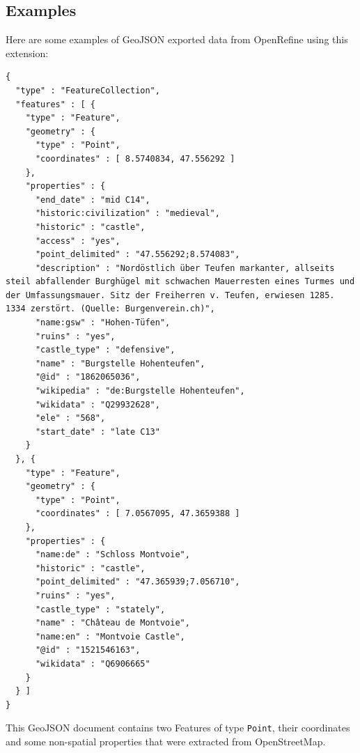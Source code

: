 \subsection{Examples}
Here are some examples of GeoJSON exported data from OpenRefine using this extension:
\begin{verbatim}
{
  "type" : "FeatureCollection",
  "features" : [ {
    "type" : "Feature",
    "geometry" : {
      "type" : "Point",
      "coordinates" : [ 8.5740834, 47.556292 ]
    },
    "properties" : {
      "end_date" : "mid C14",
      "historic:civilization" : "medieval",
      "historic" : "castle",
      "access" : "yes",
      "point_delimited" : "47.556292;8.574083",
      "description" : "Nordöstlich über Teufen markanter, allseits steil abfallender Burghügel mit schwachen Mauerresten eines Turmes und der Umfassungsmauer. Sitz der Freiherren v. Teufen, erwiesen 1285. 1334 zerstört. (Quelle: Burgenverein.ch)",
      "name:gsw" : "Hohen-Tüfen",
      "ruins" : "yes",
      "castle_type" : "defensive",
      "name" : "Burgstelle Hohenteufen",
      "@id" : "1862065036",
      "wikipedia" : "de:Burgstelle Hohenteufen",
      "wikidata" : "Q29932628",
      "ele" : "568",
      "start_date" : "late C13"
    }
  }, {
    "type" : "Feature",
    "geometry" : {
      "type" : "Point",
      "coordinates" : [ 7.0567095, 47.3659388 ]
    },
    "properties" : {
      "name:de" : "Schloss Montvoie",
      "historic" : "castle",
      "point_delimited" : "47.365939;7.056710",
      "ruins" : "yes",
      "castle_type" : "stately",
      "name" : "Château de Montvoie",
      "name:en" : "Montvoie Castle",
      "@id" : "1521546163",
      "wikidata" : "Q6906665"
    }
  } ]
}
\end{verbatim}
This GeoJSON document contains two Features of type \texttt{Point}, their coordinates and some non-spatial properties that
were extracted from OpenStreetMap.
